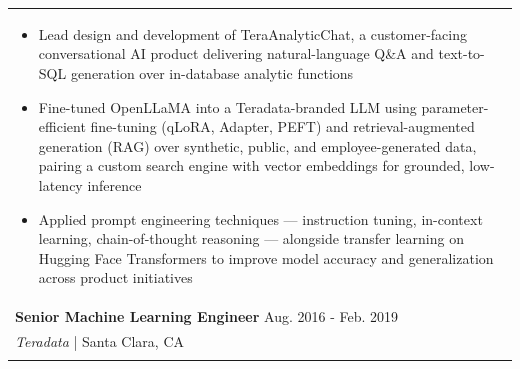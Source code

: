 \documentclass[letterpaper,11pt]{article} %
\begin{document}
\begin{tabular}{p{18.5cm}}
\begin{itemize}
\item Lead design and development of TeraAnalyticChat, a customer-facing conversational AI product delivering natural-language Q\&A and text-to-SQL generation over in-database analytic functions
\item Fine-tuned OpenLLaMA into a Teradata-branded LLM using parameter-efficient fine-tuning (qLoRA, Adapter, PEFT) and retrieval-augmented generation (RAG) over synthetic, public, and employee-generated data, pairing a custom search engine with vector embeddings for grounded, low-latency inference
\item Applied prompt engineering techniques — instruction tuning, in-context learning, chain-of-thought reasoning — alongside transfer learning on Hugging Face Transformers to improve model accuracy and generalization across product initiatives

\end{itemize} \\ 
\vspace{.1mm}

{\bf Senior Machine Learning Engineer} \hfill Aug. 2016 - Feb. 2019\\
{\it{Teradata}} | Santa Clara, CA\\

\begin{itemize}


\end{itemize}
\end{tabular}
\end{document}
